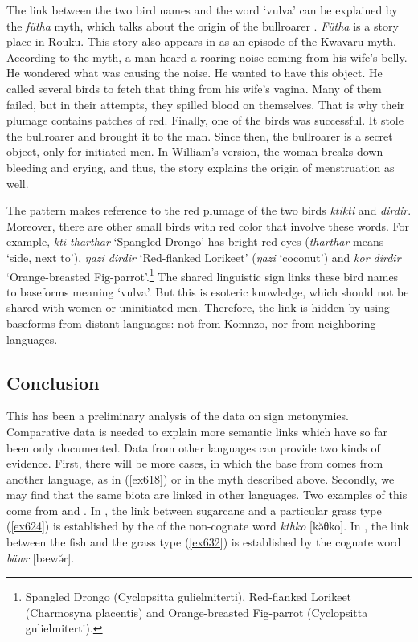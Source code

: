 The link between the two bird names and the word `vulva' can be explained by the \emph{fütha} myth, which talks about the origin of the bullroarer \citep[80]{Ayres:ws}. \emph{Fütha} is a story place in Rouku. This story also appears in \citep[307]{Williams:1936transfly} as an episode of the Kwavaru myth. According to the myth, a man heard a roaring noise coming from his wife's belly. He wondered what was causing the noise. He wanted to have this object. He called several birds  to fetch that thing from his wife's vagina. Many of them failed, but in their attempts, they spilled blood on themselves. That is why their plumage contains patches of red. Finally, one of the birds was successful. It stole the bullroarer and brought it to the man. Since then, the bullroarer is a secret object, only for initiated men. In William's version, the woman breaks down bleeding and crying, and thus, the story explains the origin of menstruation as well.%

The  pattern makes reference to the red plumage of the two birds \emph{ktikti} and \emph{dirdir}. Moreover, there are other small birds with red color that involve these words. For example, \emph{kti tharthar} `Spangled Drongo' has bright red eyes (\emph{tharthar} means `side, next to'), \emph{ŋazi dirdir} `Red-flanked Lorikeet' (\emph{ŋazi} `coconut') and \emph{kor dirdir} `Orange-breasted Fig-parrot'.\footnote{Spangled Drongo (Cyclopsitta gulielmiterti), Red-flanked Lorikeet (Charmosyna placentis) and Orange-breasted Fig-parrot (Cyclopsitta gulielmiterti).} The shared linguistic sign links these bird names to baseforms meaning `vulva'. But this is esoteric knowledge, which should not be shared with women or uninitiated men. Therefore, the link is hidden by using baseforms from distant languages: not from Komnzo, nor from neighboring languages.

\subsection{Conclusion}\label{redupconcl}

This has been a preliminary analysis of the data on sign metonymies. Comparative data is needed to explain more semantic links which have so far been only documented. Data from other languages can provide two kinds of evidence. First, there will be more cases, in which the base from comes from another language, as in (\ref{ex618}) or in the myth described above. Secondly, we may find that the same biota are linked in other languages. Two examples of this come from  and . In , the link between sugarcane and a particular grass type (\ref{ex624}) is established by the  of the non-cognate word \emph{kthko} [kə̆θko]. In , the  link between the fish and the grass type (\ref{ex632}) is established by the cognate word \emph{bäwr} [bæwə̆r].

